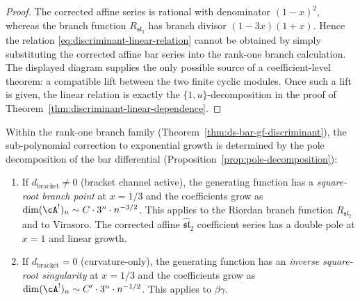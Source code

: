 \begin{proof}
The corrected affine series is rational with denominator $(1-x)^2$,
whereas the branch function $R_{\mathfrak{sl}_2}$ has branch divisor
$(1-3x)(1+x)$.  Hence the relation
\eqref{eq:discriminant-linear-relation} cannot be obtained by simply
substituting the corrected affine bar series into the rank-one branch
calculation.  The displayed diagram supplies the only possible source
of a coefficient-level theorem: a compatible lift between the two
finite cyclic modules.  Once such a lift is given, the linear relation
is exactly the $\{1,u\}$-decomposition in the proof of
Theorem~\ref{thm:discriminant-linear-dependence}.
\end{proof}

\begin{proposition}
\label{prop:pole-singularity-type}
Within the rank-one branch family
(Theorem~\textup{\ref{thm:ds-bar-gf-discriminant}}), the sub-polynomial
correction to exponential growth is determined by the pole decomposition
of the bar differential
(Proposition~\textup{\ref{prop:pole-decomposition}}):
\begin{enumerate}
\item If $d_{\mathrm{bracket}} \neq 0$ (bracket channel active),
 the generating function has a \emph{square-root branch point}
 at $x = 1/3$ and the coefficients grow as
 $\dim (\cA^!)_n \sim C \cdot 3^n \cdot n^{-3/2}$.
 This applies to the Riordan branch function
 $R_{\mathfrak{sl}_2}$ and to Virasoro.  The corrected affine
 $\widehat{\mathfrak{sl}}_2$ coefficient series has a double pole at
 $x=1$ and linear growth.
\item If $d_{\mathrm{bracket}} = 0$ (curvature-only), the generating function
 has an \emph{inverse square-root singularity} at $x = 1/3$ and
 the coefficients grow as
 $\dim (\cA^!)_n \sim C' \cdot 3^n \cdot n^{-1/2}$.
 This applies to $\beta\gamma$.
\end{enumerate}
\end{proposition}

